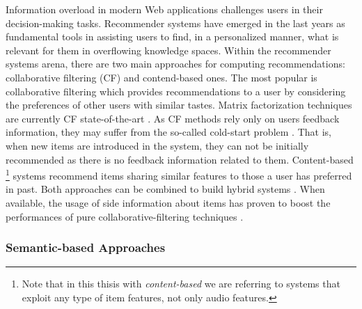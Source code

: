 Information overload in modern Web applications challenges users in their decision-making tasks. 
Recommender systems have emerged in the last years as fundamental tools in assisting users to find, in a personalized manner, what is relevant for them in overflowing knowledge spaces. 
Within the recommender systems arena, there are two main approaches for computing recommendations: collaborative filtering (CF) and contend-based ones.
The most popular is collaborative filtering which provides recommendations to a user by considering the preferences of other users with similar tastes. 
Matrix factorization techniques are currently CF state-of-the-art \citep{Koren2009}. 
As CF methods rely only on users feedback information, they may suffer from the so-called cold-start problem \citep{Saveski2014}. That is, when new items are introduced in the system, they can not be initially recommended as there is no feedback information related to them.
Content-based
\footnote{Note that in this thisis with \textit{content-based} we are referring to systems that exploit any type of item features, not only audio features.} 
systems recommend items sharing similar features to those a user has preferred in past. 
Both approaches can be combined to build hybrid systems \cite{Burke2002}. 
When available, the usage of side information about items has proven to boost the performances of pure collaborative-filtering techniques \cite{Ning12}. %



\subsubsection{Semantic-based Approaches}
\label{sec:SOA:mir:recommendation:semantic}

